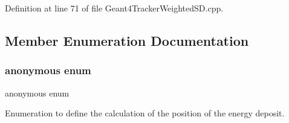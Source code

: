 Definition at line 71 of file Geant4\+Tracker\+Weighted\+S\+D.\+cpp.



\subsection{Member Enumeration Documentation}
\hypertarget{struct_d_d4hep_1_1_simulation_1_1_tracker_weighted_a8cdc474134c1f8b3a8344e32fc3d4421}{}\label{struct_d_d4hep_1_1_simulation_1_1_tracker_weighted_a8cdc474134c1f8b3a8344e32fc3d4421} 
\subsubsection{\texorpdfstring{anonymous enum}{anonymous enum}}
{\footnotesize\ttfamily anonymous enum}



Enumeration to define the calculation of the position of the energy deposit. 

